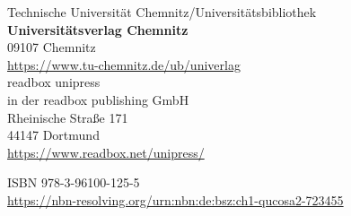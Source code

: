 \documentclass[a5paper,10pt,openright,twoside]{article}
\begin{document}
\begin{small}
Technische Universität Chemnitz/Universitätsbibliothek\\
\textbf{Universitätsverlag Chemnitz}\\
09107 Chemnitz\\
\url{https://www.tu-chemnitz.de/ub/univerlag}\\[1ex]

readbox unipress\\
in der readbox publishing GmbH\\ 
Rheinische Straße 171\\
44147 Dortmund\\
\url{https://www.readbox.net/unipress/}\\[1ex]


ISBN 978-3-96100-125-5\\

\url{https://nbn-resolving.org/urn:nbn:de:bsz:ch1-qucosa2-723455}\\

\end{small}

\newpage
\endgroup
\end{document}
